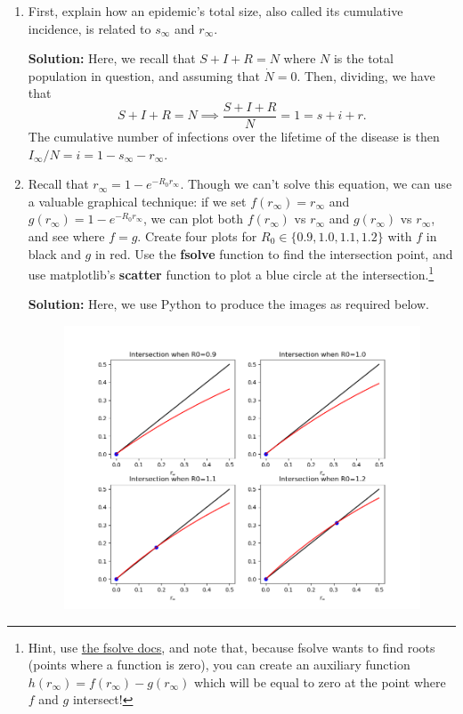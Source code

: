 \documentclass[11pt]{article}
\begin{document}
\begin{enumerate}
	\begin{enumerate}[label=\alph*.]
		\item First, explain how an epidemic's total size, also called its cumulative incidence, is related to $s_\infty$ and $r_\infty$. 
		\begin{tcolorbox}[breakable]
			\textbf{Solution:}
			Here, we recall that $S+I+R=N$ where $N$ is the total population in question, and assuming that $\dot{N}=0$. Then, dividing, we have that 
			\begin{equation*}
				S+I+R=N \implies \frac{S+I+R}{N}=1=s+i+r.
			\end{equation*}
			The cumulative number of infections over the lifetime of the disease is then $I_\infty/N = i = 1-s_\infty-r_\infty$.
		\end{tcolorbox}
		\item Recall that $r_\infty = 1-e^{-R_0 r_\infty}$. Though we can't solve this equation, we can use a
		 valuable graphical technique: if we set $f(r_\infty) = r_\infty$ and $g(r_\infty) = 1-e^{-R_0 r_\infty}$, we can plot both $f(r_\infty)$ vs $r_\infty$ and $g(r_\infty)$ vs $r_\infty$, and see where $f=g$. Create four plots for $R_0 \in \{0.9, 1.0, 1.1, 1.2\}$ with $f$ in black and $g$ in red. Use the {\bf fsolve} function to find the intersection point, and use matplotlib's {\bf scatter} function to plot a blue circle at the intersection.\footnote{Hint, use \href{https://docs.scipy.org/doc/scipy/reference/generated/scipy.optimize.fsolve.html}{the fsolve docs}, and note that, because fsolve wants to find roots (points where a function is zero), you can create an auxiliary function $h(r_\infty) = f(r_\infty)-g(r_\infty)$ which will be equal to zero at the point where $f$ and $g$ intersect!}
		\begin{tcolorbox}[breakable]
			\textbf{Solution:}
			Here, we use Python to produce the images as required below.
		\end{tcolorbox}
		\begin{figure}[H]
			\centering
			\includegraphics[scale=0.75]{3b.png}

\end{figure}
\end{enumerate}
\end{enumerate}
\end{document}

